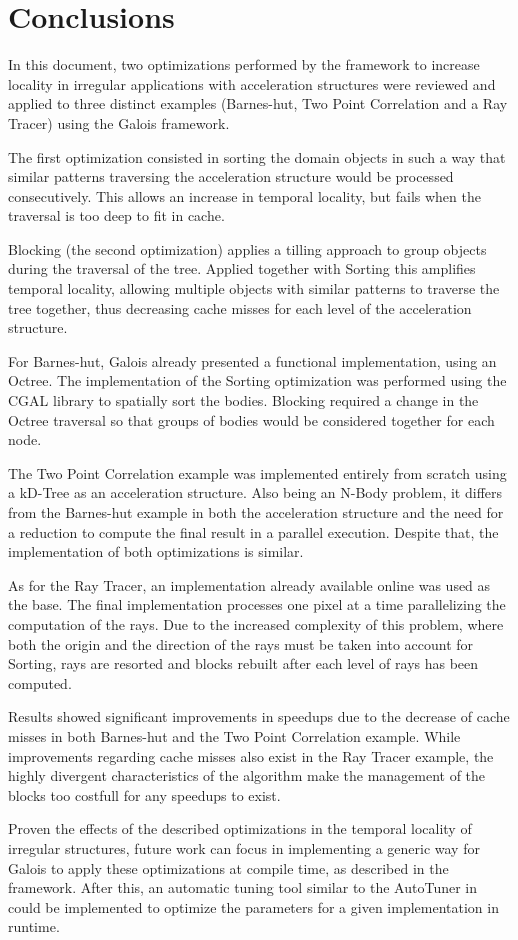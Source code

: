 \section{Conclusions}
\label{sec:conclusion}

In this document, two optimizations performed by the \treetiler framework to increase locality in irregular applications with acceleration structures were reviewed and applied to three distinct examples (Barnes-hut, Two Point Correlation and a Ray Tracer) using the Galois framework.

The first optimization consisted in sorting the domain objects in such a way that similar patterns traversing the acceleration structure would be processed consecutively. This allows an increase in temporal locality, but fails when the traversal is too deep to fit in cache.

Blocking (the second optimization) applies a tilling approach to group objects during the traversal of the tree. Applied together with Sorting this amplifies temporal locality, allowing multiple objects with similar patterns to traverse the tree together, thus decreasing cache misses for each level of the acceleration structure.

For Barnes-hut, Galois already presented a functional implementation, using an Octree. The implementation of the Sorting optimization was performed using the CGAL library to spatially sort the bodies. Blocking required a change in the Octree traversal so that groups of bodies would be considered together for each node.

The Two Point Correlation example was implemented entirely from scratch using a kD-Tree as an acceleration structure. Also being an N-Body problem, it differs from the Barnes-hut example in both the acceleration structure and the need for a reduction to compute the final result in a parallel execution. Despite that, the implementation of both optimizations is similar.

As for the Ray Tracer, an implementation already available online was used as the base. The final implementation processes one pixel at a time parallelizing the computation of the rays. Due to the increased complexity of this problem, where both the origin and the direction of the rays must be taken into account for Sorting, rays are resorted and blocks rebuilt after each level of rays has been computed.

Results showed significant improvements in speedups due to the decrease of cache misses in both Barnes-hut and the Two Point Correlation example. While improvements regarding cache misses also exist in the Ray Tracer example, the highly divergent characteristics of the algorithm make the management of the blocks too costfull for any speedups to exist.

Proven the effects of the described optimizations in the temporal locality of irregular structures, future work can focus in implementing a generic way for Galois to apply these optimizations at compile time, as described in the \treetiler framework. After this, an automatic tuning tool similar to the AutoTuner in \treetiler could be implemented to optimize the parameters for a given implementation in runtime.